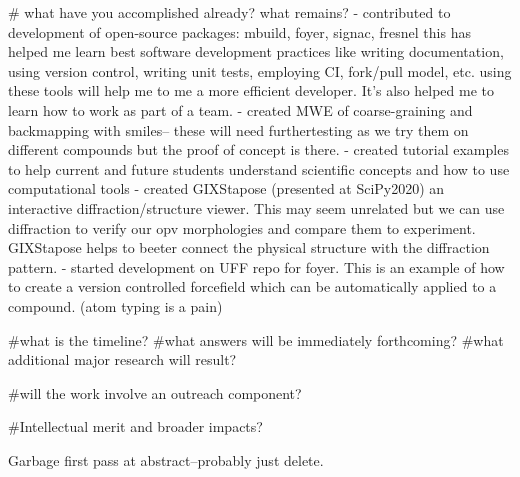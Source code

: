 # what have you accomplished already? what remains?
- contributed to development of open-source packages: mbuild, foyer, signac, fresnel
 this has helped me learn best software development practices like writing documentation, using version control, writing unit tests, employing CI, fork/pull model, etc. using these tools will help me to me a more efficient developer. It's also helped me to learn how to work as part of a team.
 - created MWE of coarse-graining and backmapping with smiles-- these will need furthertesting as we try them on different compounds but the proof of concept is there.
 - created tutorial examples to help current and future students understand scientific concepts and how to use computational tools
 - created GIXStapose (presented at SciPy2020) an interactive diffraction/structure viewer. This may seem unrelated but we can use diffraction to verify our opv morphologies and compare them to experiment. GIXStapose helps to beeter connect the physical structure with the diffraction pattern.
- started development on UFF repo for foyer. This is an example of how to create a version controlled forcefield which can be automatically applied to a compound. (atom typing is a pain)

#what is the timeline?
#what answers will be immediately forthcoming?
#what additional major research will result?

#will the work involve an outreach component?

#Intellectual merit and broader impacts?







Garbage first pass at abstract--probably just delete.

